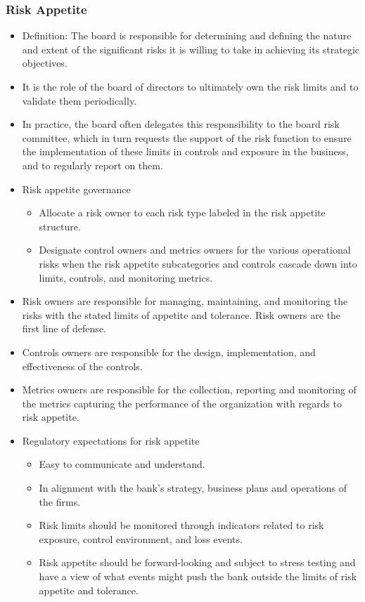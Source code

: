 \subsubsection{Risk Appetite}
\begin{itemize}
\item  Definition: The board is responsible for determining and defining the nature and extent of the significant risks it is willing to take in achieving its strategic objectives.
\item It is the role of the board of directors to ultimately own the risk limits and to validate them periodically.
\item  In practice, the board often delegates this responsibility to the board risk committee, which in turn requests the support of the risk function to ensure the implementation of these limits in controls and exposure in the business, and to regularly report on them.
\item Risk appetite governance
    \begin{itemize}
    \item Allocate a risk owner to each risk type labeled in the risk appetite structure.
    \item  Designate control owners and metrics owners for the various operational risks when the risk appetite subcategories and controls cascade down into limits, controls, and monitoring metrics.
    \end{itemize}
\item Risk owners are responsible for managing, maintaining, and monitoring the risks with the stated limits of appetite and tolerance. Risk owners are the first line of defense.
\item  Controls owners are responsible for the design, implementation, and effectiveness of the controls.
\item  Metrics owners are responsible for the collection, reporting and monitoring of the metrics capturing the performance of the organization with regards to risk appetite.
\item Regulatory expectations for risk appetite
    \begin{itemize}
    \item  Easy to communicate and understand.
    \item  In alignment with the bank's strategy, business plans and operations of the firms.
    \item  Risk limits should be monitored through indicators related to risk exposure, control environment, and loss events.
    \item  Risk appetite should be forward-looking and subject to stress testing and have a view of what events might push the bank outside the limits of risk appetite and tolerance.
    \end{itemize}

\end{itemize}




